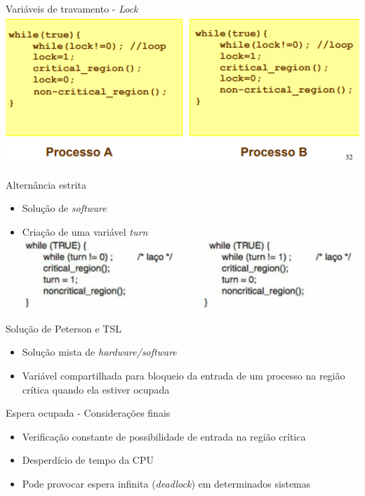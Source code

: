 \documentclass[aspectratio=169,
				xcolor=table]{beamer}
\begin{document}
	\begin{frame}{Variáveis de travamento - \textit{Lock}}
		\includegraphics[keepaspectratio, height=0.5\paperheight]{../figs/cap05/lock.png}
	\end{frame}
	
	\begin{frame}{Alternância estrita}
		
		\begin{itemize}
			\item Solução de \textit{software}
			\vspace{1em}
			\item Criação de uma variável \textit{turn}
			\vspace{1em}
			\includegraphics[keepaspectratio, height=0.5\paperheight]{../figs/cap05/turn.png}
		\end{itemize}	
	\end{frame}
	
	\begin{frame}{Solução de Peterson e TSL}
		\begin{itemize}
			\item Solução mista de \textit{hardware/software}
			\vspace{1em}
			\item Variável compartilhada para bloqueio da entrada de um processo na região crítica quando ela estiver ocupada
		\end{itemize}
		
	\end{frame}
	
	\begin{frame}{Espera ocupada - Considerações finais}
		\begin{itemize}
			\item Verificação constante de possibilidade de entrada na região crítica
			\item Desperdício de tempo da CPU
			\item Pode provocar espera infinita (\textit{deadlock}) em determinados sistemas
		\end{itemize}
	\end{frame}
	
\end{document}
